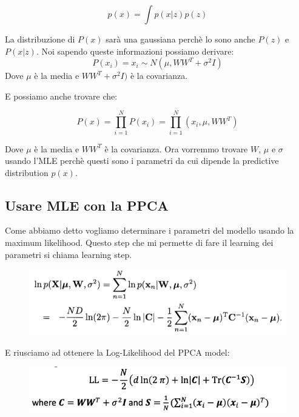 \documentclass[14pt]{extreport}
\begin{document}
$$p(x) = \int p(x|z)p(z)$$

La distribuzione di $P(x)$ sarà una gaussiana perchè lo sono anche $P(z)$ e $P(x|z)$. Noi sapendo queste informazioni possiamo derivare:
$$P(x_i) = x_i \sim N(\mu, WW^T + \sigma^2I)$$
Dove $\mu$ è la media e $WW^T + \sigma^2I)$ è la covarianza.

E possiamo anche trovare che:

$$P(x) = \prod_{i=1}^N P(x_i) = \prod_{i=1}^N (x_i, \mu, WW^T)$$

Dove $\mu$ è la media e $WW^T$ è la covarianza.
Ora vorremmo trovare $W$, $\mu$ e $\sigma$ usando l'MLE perchè questi sono i parametri da cui dipende la predictive distribution $p(x)$.

\subsection{Usare MLE con la PPCA}

Come abbiamo detto vogliamo determinare i parametri del modello usando la maximum likelihood. Questo step che mi permette di fare il learning dei parametri
si chiama learning step. 

\begin{figure}[H] 
\centering
\includegraphics[width=0.7\linewidth]{485.jpeg}
\end{figure}

E riusciamo ad ottenere la Log-Likelihood del PPCA model:

\begin{figure}[H] 
	\centering
	\includegraphics[width=0.7\linewidth]{486.jpeg}
	\end{figure}
\end{document}
